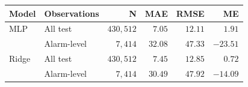 \begin{tabular}{@{}llrrrr@{}}
\toprule
\textbf{Model} & \textbf{Observations} & \textbf{N} & \textbf{MAE} & \textbf{RMSE} & \textbf{ME} \\
\midrule
MLP & All test & $430{,}512$ & $7.05$ & $12.11$ & $1.91$ \\
\addlinespace
 & Alarm-level & $7{,}414$ & $32.08$ & $47.33$ & $-23.51$ \\
\addlinespace
Ridge & All test & $430{,}512$ & $7.45$ & $12.85$ & $0.72$ \\
\addlinespace
 & Alarm-level & $7{,}414$ & $30.49$ & $47.92$ & $-14.09$ \\
\bottomrule
\end{tabular}
